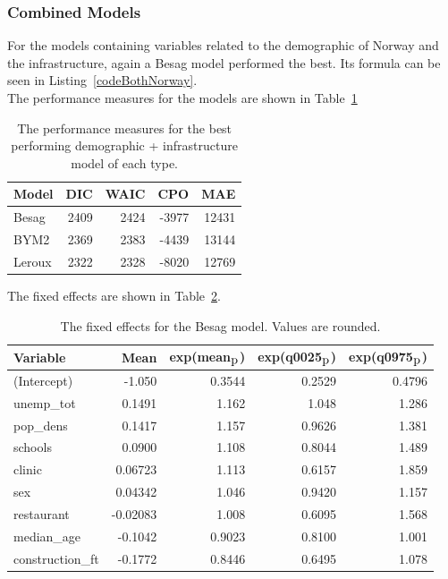 \subsubsection{Combined Models}
For the models containing variables related to the demographic of Norway and the infrastructure, again a Besag model performed the best. Its formula can be seen in Listing~\ref{codeBothNorway}. \\
The performance measures for the models are shown in Table~\ref{bothNorway}
\begin{table}[H] 
\caption{The performance measures for the best performing demographic + infrastructure model of each type. \label{bothNorway}}
\begin{tabular}{l r r r r}
\toprule
\textbf{Model}	& \textbf{DIC}	& \textbf{WAIC} & \textbf{CPO} & \textbf{MAE} \\
\midrule
Besag  & 2409 & 2424 & -3977 & 12431 \\
BYM2 & 2369 & 2383 & -4439 & 13144\\
Leroux &  2322 & 2328 & -8020 & 12769\\
\bottomrule
\end{tabular}
\end{table}
The fixed effects are shown in Table~\ref{fixedAllNorway}.
\begin{table}[H] 
\caption{The fixed effects for the Besag model. Values are rounded. \label{fixedAllNorway}}
\begin{tabular}{l r r r r}
\toprule
\textbf{Variable}	& \textbf{Mean}	& \textbf{exp(mean$_{\hbox{p}}$)} & \textbf{exp(q0025$_{\hbox{p}}$)} & \textbf{exp(q0975$_{\hbox{p}}$)} \\
\midrule
(Intercept) & -1.050 & 0.3544 & 0.2529 & 0.4796\\
unemp\_tot & 0.1491 & 1.162 & 1.048 & 1.286 \\
pop\_dens & 0.1417 & 1.157 & 0.9626 & 1.381 \\
schools & 0.0900 & 1.108 & 0.8044 & 1.489 \\
clinic & 0.06723 & 1.113 & 0.6157 & 1.859 \\
sex & 0.04342 & 1.046 & 0.9420 & 1.157 \\
restaurant & -0.02083 & 1.008 & 0.6095 & 1.568 \\
median\_age & -0.1042 & 0.9023 & 0.8100 & 1.001 \\
construction\_ft & -0.1772 & 0.8446 & 0.6495 & 1.078 \\
\bottomrule
\end{tabular}
\end{table}
